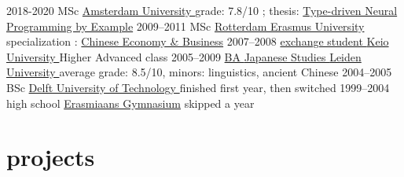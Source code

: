 \documentclass[]{friggeri-cv}
\begin{document}
\begin{entrylist}
  \entry
    {2018-2020}
    {MSc }
    {\href{http://www.uva.nl/}{
      Amsterdam University
    }}
    {
      grade: 7.8/10
      ; thesis: \href{https://arxiv.org/abs/2008.12613}{Type-driven Neural Programming by Example}
    }
  \entry
    {2009–2011}
    {MSc }
    {\href{https://www.rsm.nl/}{
      Rotterdam Erasmus University
    }}
    {
      specialization
      :
      \href{https://www.rsm.nl/about-rsm/organisation/expertise-search/chinese-economy/}{Chinese Economy \& Business}}
  \entry
    {2007–2008}
    {\href{https://www.cjs.keio.ac.jp/?page=24}{%
exchange student 
    }}
    {\href{https://www.keio.ac.jp/}{
      Keio University
    }}
    {
      Higher Advanced class
    }
  \entry
    {2005–2009}
    {\href{https://www.universiteitleiden.nl/onderwijs/opleidingen/bachelor/japanstudies}{BA \normalfont
    {
      Japanese Studies
    }}}
    {\href{https://www.universiteitleiden.nl/}{
      Leiden University
    }}
    {
      average grade: 8.5/10, minors: linguistics, ancient Chinese
    }
  \entry
    {2004–2005}
    {BSc \href{https://ocw.tudelft.nl/programs/bachelor/technische-informatica/}{}}
    {\href{https://www.tudelft.nl/}{
      Delft University of Technology
    }}
    {finished first year, then switched}
  \entry
    {1999–2004}
    {%
high school
      \href{https://nl.wikipedia.org/wiki/Profiel_natuur_en_techniek}{}}
    {\href{http://www.erasmiaans.nl/}{Erasmiaans Gymnasium}}
    {skipped a year}
\end{entrylist}

\newpage

\section{projects}
\end{document}
